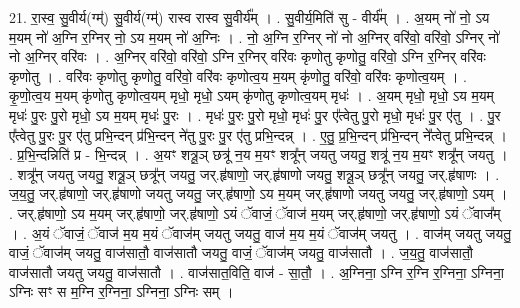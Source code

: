 \documentclass[17pt]{extarticle}
\begin{document}
21. रा॒स्व॒ सु॒वीर्य(ग्म्॑) सु॒वीर्य(ग्म्॑) रास्व रास्व सु॒वीर्य᳚म् । . सु॒वीर्य॒मिति॑ सु - वीर्य᳚म् । . अ॒यम् नो॑ नो॒ ऽय म॒यम् नो॑ अ॒ग्नि र॒ग्निर् नो॒ ऽय म॒यम् नो॑ अ॒ग्निः । . नो॒ अ॒ग्नि र॒ग्निर् नो॑ नो अ॒ग्निर् वरि॑वो॒ वरि॑वो॒ ऽग्निर् नो॑ नो अ॒ग्निर् वरि॑वः । . अ॒ग्निर् वरि॑वो॒ वरि॑वो॒ ऽग्नि र॒ग्निर् वरि॑वः कृणोतु कृणोतु॒ वरि॑वो॒ ऽग्नि र॒ग्निर् वरि॑वः कृणोतु । . वरि॑वः कृणोतु कृणोतु॒ वरि॑वो॒ वरि॑वः कृणोत्व॒य म॒यम् कृ॑णोतु॒ वरि॑वो॒ वरि॑वः कृणोत्व॒यम् । . कृ॒णो॒त्व॒य म॒यम् कृ॑णोतु कृणोत्व॒यम् मृधो॒ मृधो॒ ऽयम् कृ॑णोतु कृणोत्व॒यम् मृधः॑ । . अ॒यम् मृधो॒ मृधो॒ ऽय म॒यम् मृधः॑ पु॒रः पु॒रो मृधो॒ ऽय म॒यम् मृधः॑ पु॒रः । . मृधः॑ पु॒रः पु॒रो मृधो॒ मृधः॑ पु॒र ए᳚त्वेतु पु॒रो मृधो॒ मृधः॑ पु॒र ए॑तु । . पु॒र ए᳚त्वेतु पु॒रः पु॒र ए॑तु प्रभि॒न्दन् प्र॑भि॒न्दन् ने॑तु पु॒रः पु॒र ए॑तु प्रभि॒न्दन्न् । . ए॒तु॒ प्र॒भि॒न्दन् प्र॑भि॒न्दन् ने᳚त्वेतु प्रभि॒न्दन्न् । . प्र॒भि॒न्दन्निति॑ प्र - भि॒न्दन्न् । . अ॒यꣳ शत्रू॒ञ् छत्रू॑ न॒य म॒यꣳ शत्रू᳚न् जयतु जयतु॒ शत्रू॑ न॒य म॒यꣳ शत्रू᳚न् जयतु । . शत्रू᳚न् जयतु जयतु॒ शत्रू॒ञ् छत्रू᳚न् जयतु॒ जर्.हृ॑षाणो॒ जर्.हृ॑षाणो जयतु॒ शत्रू॒ञ् छत्रू᳚न् जयतु॒ जर्.हृ॑षाणः । . ज॒य॒तु॒ जर्.हृ॑षाणो॒ जर्.हृ॑षाणो जयतु जयतु॒ जर्.हृ॑षाणो॒ ऽय म॒यम् जर्.हृ॑षाणो जयतु जयतु॒ जर्.हृ॑षाणो॒ ऽयम् । . जर्.हृ॑षाणो॒ ऽय म॒यम् जर्.हृ॑षाणो॒ जर्.हृ॑षाणो॒ ऽयं ॅवाजं॒ ॅवाज॑ म॒यम् जर्.हृ॑षाणो॒ जर्.हृ॑षाणो॒ ऽयं ॅवाज᳚म् । . अ॒यं ॅवाजं॒ ॅवाज॑ म॒य म॒यं ॅवाज॑म् जयतु जयतु॒ वाज॑ म॒य म॒यं ॅवाज॑म् जयतु । . वाज॑म् जयतु जयतु॒ वाजं॒ ॅवाज॑म् जयतु॒ वाज॑सातौ॒ वाज॑सातौ जयतु॒ वाजं॒ ॅवाज॑म् जयतु॒ वाज॑सातौ । . ज॒य॒तु॒ वाज॑सातौ॒ वाज॑सातौ जयतु जयतु॒ वाज॑सातौ । . वाज॑सात॒विति॒ वाज॑ - सा॒तौ॒ । . अ॒ग्निना॒ ऽग्नि र॒ग्नि र॒ग्निना॒ ऽग्निना॒ ऽग्निः सꣳ स म॒ग्नि र॒ग्निना॒ ऽग्निना॒ ऽग्निः सम् । \newline
\end{document}
